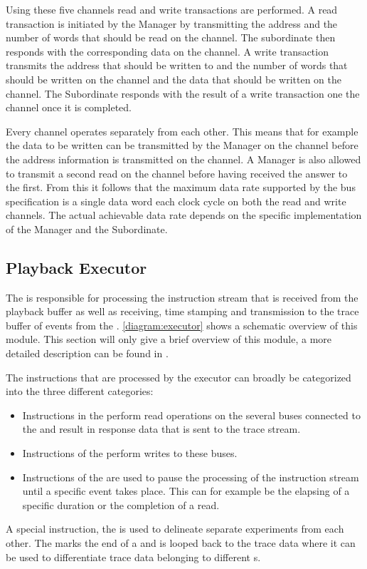 Using these five channels read and write transactions are performed. A read transaction is initiated by the Manager by transmitting the address and the number of words that should be read on the \AR{} channel. The subordinate then responds with the corresponding data on the \R{} channel. A write transaction transmits the address that should be written to and the number of words that should be written on the \AW{} channel  and the data that should be written on the \W{} channel. The Subordinate responds with the result of a write transaction one the \B{} channel once it is completed.

Every channel operates separately from each other. This means that for example the data to be written can be transmitted by the Manager on the \W{} channel before the address information is transmitted on the \AW{} channel. A Manager is also allowed to transmit a second read on the \AR{} channel before having received the answer to the first.
From this it follows that the maximum data rate supported by the bus specification is a single data word each clock cycle on both the read and write channels. The actual achievable data rate depends on the specific implementation of the Manager and the Subordinate.

\subsection{Playback Executor}\label{sec:pb_exec}
The \pbexec{} is responsible for processing the instruction stream that is received from the playback buffer as well as receiving, time stamping and transmission to the trace buffer of events from the \ASIC{}. \autoref{diagram:executor} shows a schematic overview of this module. This section will only give a brief overview of this module, a more detailed description can be found in \autocite{ref:pb_exec}.

The instructions that are processed by the executor can broadly be categorized into the three different categories:
\begin{itemize}
\item Instructions in the \readCat{} perform read operations on the several buses connected to the \pbexec{} and result in response data that is sent to the trace stream.
\item Instructions of the \writeCat{} perform writes to these buses.
\item Instructions of the \waitCat{} are used to pause the processing of the instruction stream until a specific event takes place. This can for example be the elapsing of a specific duration or the completion of a read.
\end{itemize}
A special instruction, the \haltInstr{} is used to delineate separate experiments from each other. The \haltInstr{} marks the end of a \PlaybackProgram{} and is looped back to the trace data where it can be used to differentiate trace data belonging to different \PlaybackProgram{}s.

